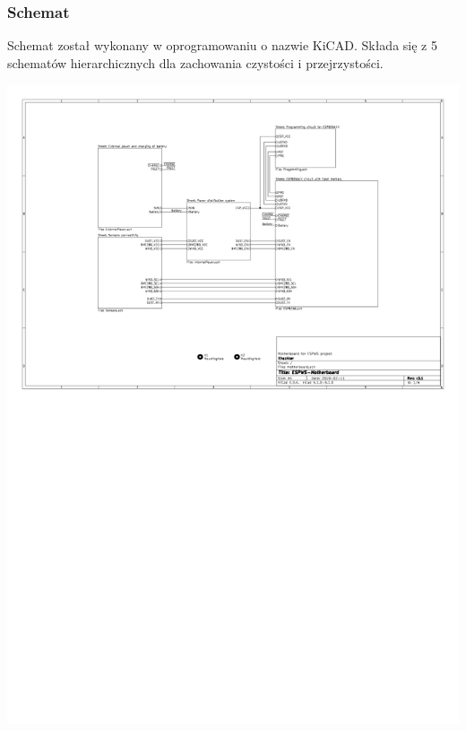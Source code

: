 \documentclass{beamer}
\begin{document}
\begin{frame}
\frametitle{Schemat}
Schemat został wykonany w oprogramowaniu o nazwie KiCAD. Składa się z 5 schematów hierarchicznych dla zachowania czystości i przejrzystości.
\begin{center}
	\includegraphics[scale=0.4]{img/first.png}
\end{center}
\end{frame}
\end{document}

